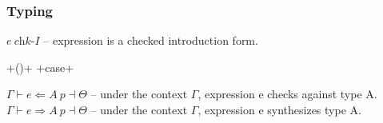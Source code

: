\documentclass[declaration,shortabstract,english]{iithesis}
\begin{document}
\subsubsection*{Typing}
$e \: \textit{chk-I}$ -- expression is a checked introduction form.
+()+
+case+

\noindent$\Gamma \vdash e \Leftarrow A \: p \dashv \Theta$ -- under the context $\Gamma$, expression e checks against type A.
         $\Gamma \vdash e \Rightarrow A \: p \dashv \Theta$ -- under the context $\Gamma$, expression e synthesizes type A.
\end{document}
